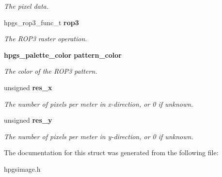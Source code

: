 \begin{DoxyCompactItemize}
\begin{DoxyCompactList}\small\item\em The pixel data. \item\end{DoxyCompactList}\item 
hpgs\_\-rop3\_\-func\_\-t {\bf rop3}\label{structhpgs__png__image__st_aa0e3b125f084f824491c9024d1032e21}

\begin{DoxyCompactList}\small\item\em The ROP3 raster operation. \item\end{DoxyCompactList}\item 
{\bf hpgs\_\-palette\_\-color} {\bf pattern\_\-color}\label{structhpgs__png__image__st_a154f2c6f42f3fd8f62917a1682789648}

\begin{DoxyCompactList}\small\item\em The color of the ROP3 pattern. \item\end{DoxyCompactList}\item 
unsigned {\bf res\_\-x}\label{structhpgs__png__image__st_a13464b76ad7ed851081bbf276362b122}

\begin{DoxyCompactList}\small\item\em The number of pixels per meter in x-\/direction, or 0 if unknown. \item\end{DoxyCompactList}\item 
unsigned {\bf res\_\-y}\label{structhpgs__png__image__st_ad6d3488a1c9d005bd34fe3d26497711c}

\begin{DoxyCompactList}\small\item\em The number of pixels per meter in y-\/direction, or 0 if unknown. \item\end{DoxyCompactList}\end{DoxyCompactItemize}


The documentation for this struct was generated from the following file:\begin{DoxyCompactItemize}
\item 
hpgsimage.h\end{DoxyCompactItemize}
